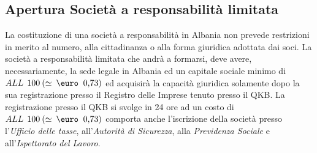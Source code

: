 \subsection[Apertura Società a responsabilità limitata]{Apertura Società a responsabilità limitata}
La costituzione di una società a responsabilità in Albania non prevede restrizioni in merito al numero, alla cittadinanza o alla forma giuridica adottata dai soci.\newline
La società a responsabilità limitata che andrà a formarsi, deve avere, necessariamente, la sede legale in Albania ed un capitale sociale minimo di $ALL \:\: 100 \: (\simeq \: \mbox{\euro\: 0,73})$ ed acquisirà la capacità giuridica solamente dopo la sua registrazione presso il Registro delle Imprese tenuto presso il \ac{QKB}\cite{qkr}.
La registrazione presso il \ac{QKB} si svolge in 24 \: ore ad un costo di $ALL \:\: 100 \: (\simeq \: \mbox{\euro\: 0,73})$ comporta anche l'iscrizione della società presso l'\textit{Ufficio delle tasse}, all'\textit{Autorità di Sicurezza}, alla \textit{Previdenza Sociale} e all'\textit{Ispettorato del Lavoro}\cite{studio_palmeri}.  